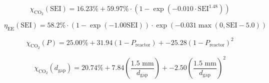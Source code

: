 \begin{equation}
  \chi_{\text{CO}_2}(\text{SEI}) = 16.23\% + 59.97\% \cdot \left(1 - \exp\left(-0.010 \cdot \text{SEI}^{1.48}\right)\right)
\end{equation}

\begin{equation}
  \eta_{\text{EE}}(\text{SEI}) = 58.2\% \cdot \left(1 - \exp\left(-1.00\text{SEI}\right)\right) \cdot \exp\left(-0.031\max(0, \text{SEI} - 5.0)\right)
\end{equation}

\begin{equation}
  \chi_{\text{CO}_2}(P) = 25.00\% + 31.94(1 - P_{\text{reactor}}) + -25.28(1 - P_{\text{reactor}})^2
\end{equation}

\begin{equation}
  \chi_{\text{CO}_2}(d_{\text{gap}}) = 20.74\% + 7.84\left(\frac{1.5\text{ mm}}{d_{\text{gap}}}\right) + -2.50\left(\frac{1.5\text{ mm}}{d_{\text{gap}}}\right)^2
\end{equation}

